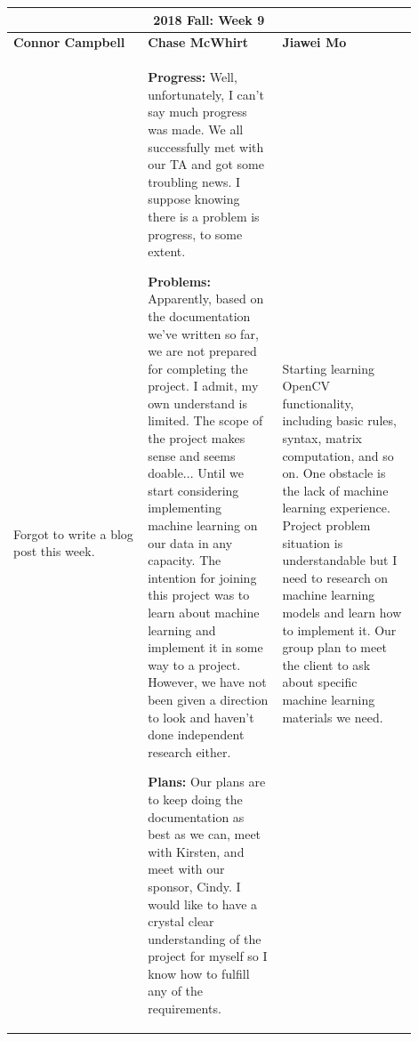 \documentclass[10pt,journal,compsoc, draftclsnofoot,onecolumn]{IEEEtran}
\begin{document}
\begin{center}
\begin{tabular}{|p{0.3\linewidth}|p{0.3\linewidth}|p{0.3\linewidth}|}
\hline
\multicolumn{3}{|c|}{\textbf{2018 Fall: Week 9}} \\
\hline
\textbf{Connor Campbell} & \textbf{Chase McWhirt} & \textbf{Jiawei Mo} \\ [0.5ex]
\hline\hline

Forgot to write a blog post this week.
&
\textbf{Progress:} Well, unfortunately, I can't say much progress was made.
We all successfully met with our TA and got some troubling news.
I suppose knowing there is a problem is progress, to some extent.

\textbf{Problems:} Apparently, based on the documentation we've written so far, we are not prepared for completing the project.
I admit, my own understand is limited.
The scope of the project makes sense and seems doable... 
Until we start considering implementing machine learning on our data in any capacity.
The intention for joining this project was to learn about machine learning and implement it in some way to a project.
However, we have not been given a direction to look and haven't done independent research either.

\textbf{Plans:} Our plans are to keep doing the documentation as best as we can, meet with Kirsten, and meet with our sponsor, Cindy.
I would like to have a crystal clear understanding of the project for myself so I know how to fulfill any of the requirements.
&
Starting learning OpenCV functionality, including basic rules, syntax, matrix computation, and so on. One obstacle is the lack of machine learning experience. Project problem situation is understandable but I need to research on machine learning models and learn how to implement it. Our group plan to meet the client to ask about specific machine learning materials we need.
\\ \hline
\end{tabular}
\end{center}
\end{document}

